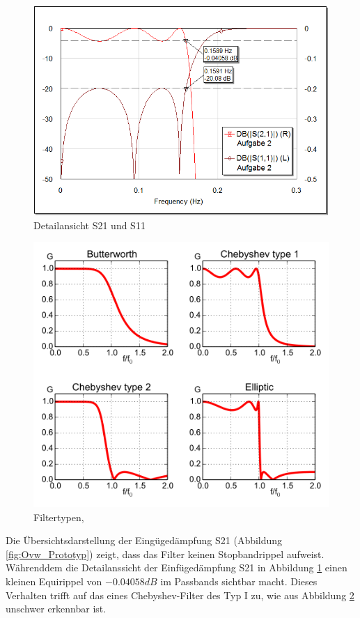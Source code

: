 \begin{figure}
    \centering
 	\includegraphics[width=\imagewidth]{images/graph-LC.png}
 	\caption{Detailansicht S21 und S11}
 	\label{fig:graph-LC}
\end{figure}

\begin{figure}
    \centering
 	\includegraphics[width=\imagewidth]{images/filtertypes.png}
 	\caption{Filtertypen, \cite{ref:wikipedia:chebyshev}}
 	\label{fig:filtertypes.png}
\end{figure}

Die    Übersichtsdarstellung     der     Eingügedämpfung     S21    (Abbildung
\ref{fig:Ovw_Prototyp}) zeigt, dass das Filter keinen Stopbandrippel aufweist.
Währenddem  die  Detailanssicht   der   Einfügedämpfung   S21   in   Abbildung
\ref{fig:graph-LC}  einen  kleinen Equirippel von $-0.04058 dB$  im  Passbands
sichtbar macht. Dieses Verhalten trifft auf das eines Chebyshev-Filter des Typ
I  zu,  wie  aus  Abbildung  \ref{fig:filtertypes.png} unschwer erkennbar ist.


